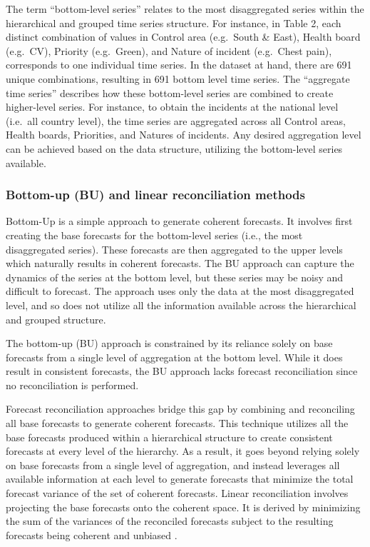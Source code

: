 \documentclass[
  authoryear,
  preprint,
  3p]{elsarticle}
\begin{document}
The term ``bottom-level series'' relates to the most disaggregated
series within the hierarchical and grouped time series structure. For
instance, in Table 2, each distinct combination of values in Control
area (e.g.~South \& East), Health board (e.g.~CV), Priority
(e.g.~Green), and Nature of incident (e.g.~Chest pain), corresponds to
one individual time series. In the dataset at hand, there are 691 unique
combinations, resulting in 691 bottom level time series. The ``aggregate
time series'' describes how these bottom-level series are combined to
create higher-level series. For instance, to obtain the incidents at the
national level (i.e.~all country level), the time series are aggregated
across all Control areas, Health boards, Priorities, and Natures of
incidents. Any desired aggregation level can be achieved based on the
data structure, utilizing the bottom-level series available.

\hypertarget{bottom-up-bu-and-linear-reconciliation-methods}{%
\subsubsection{Bottom-up (BU) and linear reconciliation
methods}\label{bottom-up-bu-and-linear-reconciliation-methods}}

Bottom-Up is a simple approach to generate coherent forecasts. It
involves first creating the base forecasts for the bottom-level series
(i.e., the most disaggregated series). These forecasts are then
aggregated to the upper levels which naturally results in coherent
forecasts. The BU approach can capture the dynamics of the series at the
bottom level, but these series may be noisy and difficult to forecast.
The approach uses only the data at the most disaggregated level, and so
does not utilize all the information available across the hierarchical
and grouped structure.

The bottom-up (BU) approach is constrained by its reliance solely on
base forecasts from a single level of aggregation at the bottom level.
While it does result in consistent forecasts, the BU approach lacks
forecast reconciliation since no reconciliation is performed.

Forecast reconciliation approaches bridge this gap by combining and
reconciling all base forecasts to generate coherent forecasts. This
technique utilizes all the base forecasts produced within a hierarchical
structure to create consistent forecasts at every level of the
hierarchy. As a result, it goes beyond relying solely on base forecasts
from a single level of aggregation, and instead leverages all available
information at each level to generate forecasts that minimize the total
forecast variance of the set of coherent forecasts. Linear
reconciliation involves projecting the base forecasts onto the coherent
space. It is derived by minimizing the sum of the variances of the
reconciled forecasts subject to the resulting forecasts being coherent
and unbiased \citep{WicEtAl2019}.
\end{document}
